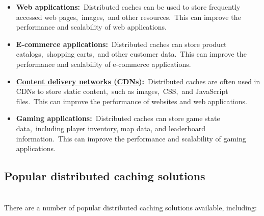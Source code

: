 \begin{itemize}
\item
\protect{}\label{3xnEydxvt4ERPqNNl5HLf}
\textbf{Web applications:}~Distributed caches can be used to store frequently accessed web pages,~images,~and other resources.~This can improve the performance and scalability of web applications.
\item
\protect{}\label{Q1PjzvkiKpSbJDWHy8jea}
\textbf{E-commerce applications:}~Distributed caches can store product catalogs,~shopping carts,~and other customer data.~This can improve the performance and scalability of e-commerce applications.
\item
\protect{}\label{ggVmi8WMtHP0rczdYWFox}
\href{https://how.dev/answers/what-is-a-content-delivery-network}{\textbf{Content delivery networks (CDNs)}}\textbf{:}~Distributed caches are often used in CDNs to store static content,~such as images,~CSS,~and JavaScript files.~This can improve the performance of websites and web applications.
\item
\protect{}\label{dEbzz8R5c02khJoBJQPex}
\textbf{Gaming applications:}~Distributed caches can store game state data,~including player inventory, map data, and leaderboard information.~This can improve the performance and scalability of gaming applications.
\end{itemize}

\subsection{Popular distributed caching solutions}\label{uGwLeLrFXz9n9TqonvlaW}
\\
There are a number of popular distributed caching solutions available, including:

